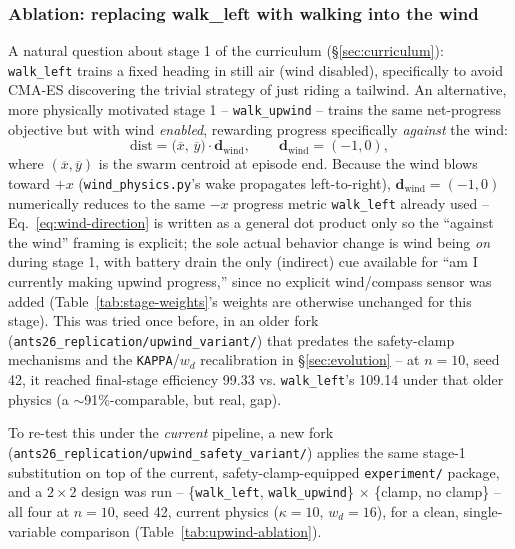 \documentclass[11pt]{article}
\begin{document}
\subsubsection{Ablation: replacing walk\_left with walking into the wind}
\label{sec:upwind-ablation}
A natural question about stage 1 of the curriculum (\S\ref{sec:curriculum}): \texttt{walk\_left}
trains a fixed heading in still air (wind disabled), specifically to avoid CMA-ES discovering
the trivial strategy of just riding a tailwind. An alternative, more physically motivated stage
1 -- \texttt{walk\_upwind} -- trains the same net-progress objective but with wind
\emph{enabled}, rewarding progress specifically \emph{against} the wind:
\begin{equation}
\text{dist} = \big(\overline{x},\, \overline{y}\big) \cdot \mathbf{d}_{\text{wind}}, \qquad \mathbf{d}_{\text{wind}} = (-1, 0),
\label{eq:wind-direction}
\end{equation}
where $(\overline{x},\overline{y})$ is the swarm centroid at episode end. Because the wind
blows toward $+x$ (\texttt{wind\_physics.py}'s wake propagates left-to-right), $\mathbf{d}_{\text{wind}}=(-1,0)$
numerically reduces to the same $-x$ progress metric \texttt{walk\_left} already used --
Eq.~\ref{eq:wind-direction} is written as a general dot product only so the ``against the
wind'' framing is explicit; the sole actual behavior change is wind being \emph{on} during
stage 1, with battery drain the only (indirect) cue available for ``am I currently making
upwind progress,'' since no explicit wind/compass sensor was added (Table~\ref{tab:stage-weights}'s
weights are otherwise unchanged for this stage). This was tried once before, in an older fork
(\texttt{ants26\_replication/upwind\_variant/}) that predates the safety-clamp mechanisms and
the \texttt{KAPPA}/$w_d$ recalibration in \S\ref{sec:evolution} -- at $n{=}10$, seed 42, it
reached final-stage efficiency 99.33 vs. \texttt{walk\_left}'s 109.14 under that older physics
(a $\sim$91\%-comparable, but real, gap).

To re-test this under the \emph{current} pipeline, a new fork
(\texttt{ants26\_replication/upwind\_safety\_variant/}) applies the same stage-1 substitution
on top of the current, safety-clamp-equipped \texttt{experiment/} package, and a $2\times2$
design was run -- \{\texttt{walk\_left}, \texttt{walk\_upwind}\} $\times$ \{clamp, no clamp\}
-- all four at $n{=}10$, seed 42, current physics ($\kappa{=}10$, $w_d{=}16$), for a clean,
single-variable comparison (Table~\ref{tab:upwind-ablation}).
\end{document}
